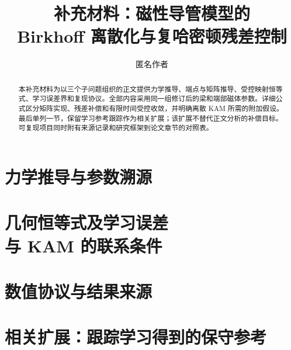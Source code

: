 \documentclass[doublespace,Afour,sageh]{sagej}
\begin{document}
\title{补充材料：磁性导管模型的\\Birkhoff 离散化与复哈密顿残差控制}
\author{匿名作者}
\begin{abstract}
本补充材料为以三个子问题组织的正文提供力学推导、端点与矩阵推导、受控映射恒等式、学习误差界和复现协议。全部内容采用同一组修订后的梁和端部磁体参数。详细公式区分矩阵实现、残差补偿和有限时间受控收敛，并明确离散 KAM 所需的附加假设。最后单列一节，保留学习参考跟踪作为相关扩展；该扩展不替代正文分析的补偿目标。可复现项目同时附有来源记录和研究框架到论文章节的对照表。
\end{abstract}
\maketitle
\raggedbottom
\section{力学推导与参数溯源}\label{sec:supp-mechanics}

\section{几何恒等式及学习误差\texorpdfstring{\\}{ }与 KAM 的联系条件}\label{sec:supp-structure}

\section{数值协议与结果来源}\label{sec:supp-experiments}

\section{相关扩展：跟踪学习得到的保守参考}\label{sec:supp-tracking}


\clearpage

\end{document}

